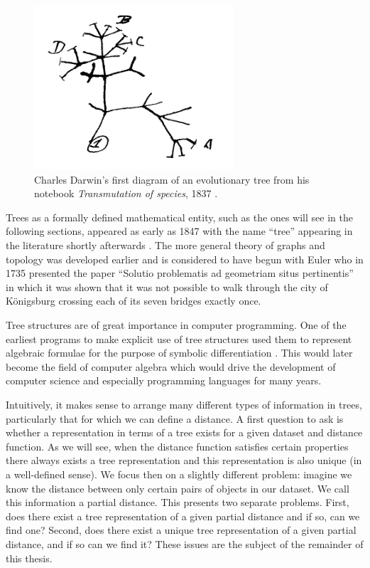 \begin{figure}
  \centering
  \includegraphics[width=20em]{figures/background2/darwin-tree.png}
  \caption{Charles Darwin's first diagram of an evolutionary tree from his
    notebook \textit{Transmutation of species}, 1837 \cite{darwin1837notebook}.}
  \label{fig:darwin-tree}
\end{figure}

Trees as a formally defined mathematical entity, such as the ones will see in
the following sections, appeared as early as 1847 with the name ``tree''
appearing in the literature shortly afterwards \cite{knuth97taocp1}.  The more
general theory of graphs and topology was developed earlier and is considered
to have begun with Euler who in 1735 presented the paper ``Solutio problematis
ad geometriam situs pertinentis'' \cite{euler1735solutio} in which it was
shown that it was not possible to walk through the city of Königsburg crossing
each of its seven bridges exactly once.

Tree structures are of great importance in computer programming.  One of the
earliest programs to make explicit use of tree structures used them to
represent algebraic formulae for the purpose of symbolic differentiation
\cite{knuth97taocp1,kahrimanian53differentiation}.  This would later become
the field of computer algebra which would drive the development of computer
science and especially programming languages for many years.

Intuitively, it makes sense to arrange many different types of information in
trees, particularly that for which we can define a distance.  A first question
to ask is whether a representation in terms of a tree exists for a given
dataset and distance function.  As we will see, when the distance function
satisfies certain properties there always exists a tree representation and
this representation is also unique (in a well-defined sense).  We focus then
on a slightly different problem: imagine we know the distance between only
certain pairs of objects in our dataset.  We call this information a partial
distance.  This presents two separate problems.  First, does there exist a
tree representation of a given partial distance and if so, can we find one?
Second, does there exist a unique tree representation of a given partial
distance, and if so can we find it?  These issues are the subject of the
remainder of this thesis.

